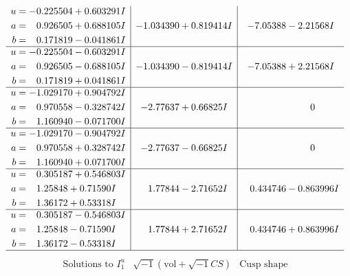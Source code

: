 \documentclass[1p]{elsarticle_modified}
\theoremstyle{definition}
\newcommand{\I}{\sqrt{-1}}
\begin{document}
$$\begin{array}{c|c|c}
\begin{aligned}
u &= -0.225504 + 0.603291 I \\
a &= \phantom{-}0.926505 + 0.688105 I \\
b &= \phantom{-}0.171819 - 0.041861 I\end{aligned}
 & -1.034390 + 0.819414 I & -7.05388 - 2.21568 I \\ \hline\begin{aligned}
u &= -0.225504 - 0.603291 I \\
a &= \phantom{-}0.926505 - 0.688105 I \\
b &= \phantom{-}0.171819 + 0.041861 I\end{aligned}
 & -1.034390 - 0.819414 I & -7.05388 + 2.21568 I \\ \hline\begin{aligned}
u &= -1.029170 + 0.904792 I \\
a &= \phantom{-}0.970558 - 0.328742 I \\
b &= \phantom{-}1.160940 - 0.071700 I\end{aligned}
 & -2.77637 + 0.66825 I & \phantom{-0.000000 } 0 \\ \hline\begin{aligned}
u &= -1.029170 - 0.904792 I \\
a &= \phantom{-}0.970558 + 0.328742 I \\
b &= \phantom{-}1.160940 + 0.071700 I\end{aligned}
 & -2.77637 - 0.66825 I & \phantom{-0.000000 } 0 \\ \hline\begin{aligned}
u &= \phantom{-}0.305187 + 0.546803 I \\
a &= \phantom{-}1.25848 + 0.71590 I \\
b &= \phantom{-}1.36172 + 0.53318 I\end{aligned}
 & \phantom{-}1.77844 - 2.71652 I & \phantom{-}0.434746 - 0.863996 I \\ \hline\begin{aligned}
u &= \phantom{-}0.305187 - 0.546803 I \\
a &= \phantom{-}1.25848 - 0.71590 I \\
b &= \phantom{-}1.36172 - 0.53318 I\end{aligned}
 & \phantom{-}1.77844 + 2.71652 I & \phantom{-}0.434746 + 0.863996 I\\
 \hline 
 \end{array}$$\newpage$$\begin{array}{c|c|c}  
\text{Solutions to }I^u_{1}& \I (\text{vol} + \sqrt{-1}CS) & \text{Cusp shape}\\

\end{array}$$
\end{document}
